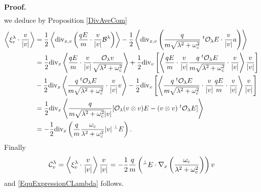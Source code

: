 \documentclass[12pt, a4paper]{article}
\newcounter{steps}
\newenvironment{proof}[1][]{%
\par\medbreak\setcounter{steps}{0}
{\noindent\bfseries Proof#1. }} {\hfill\fbox{\ }\medbreak}
\newcommand{\xil}[0]{
\xi^\lambda}
\newcommand{\bl}[0]{
{\cal B}^\lambda}
\newcommand{\cl}[0]{
{\cal C} ^\lambda}
\newcommand{\ol}[0]{
{\cal O}_\lambda}
\newcommand{\radlo}[0]{
\sqrt{\lambda ^2 + \omega _c ^2}}
\newcommand{\Divx}[0]{
\mathrm{div}_x}
\newcommand{\Divv}[0]{
\mathrm{div}_v}
\newcommand{\Divxv}[0]{
\mathrm{div}_{x,v}}
\newcommand{\ave}[1]{
\left \langle #1 \right \rangle }
\begin{document}
\begin{proof}
\begin{align*}
\end{align*}
we deduce by Proposition \ref{DivAveCom}
\begin{align*}
\ave{\xil _v \cdot \frac{v}{|v|}} & = \frac{1}{2}\ave{\Divxv \left (\frac{qE}{m} \cdot \frac{v}{|v|} \bl \right )} - \frac{1}{2} \ave{\Divxv\left ( \frac{q}{m\radlo} \;{^t \ol} E \cdot \frac{v}{|v|} a   \right ) }\\
& = \frac{1}{2} \Divx \ave{\frac{qE}{m} \cdot \frac{v}{|v|} \frac{\ol v}{\radlo}} + 
\frac{1}{2}\Divv \left [ \ave{\frac{qE}{m} \cdot \frac{v}{|v|} \frac{q \;{^t \ol} E}{m \radlo}\cdot \frac{v}{|v|}   }\frac{v}{|v|}  \right ]\\
& - \frac{1}{2} \Divx \ave{\frac{q\;{^t \ol}E}{m\radlo} \cdot  \frac{v}{|v|} v} -
\frac{1}{2}\Divv \left [ \ave{ \frac{q \;{^t \ol} E}{m \radlo}\cdot \frac{v}{|v|} \frac{qE}{m} \cdot \frac{v}{|v|}  }\frac{v}{|v|}  \right ]\\
& = \frac{1}{2}\Divx \ave{\frac{q}{m \radlo |v|} [ \ol (v\otimes v) E - (v \otimes v) \;{^t \ol} E]}\\
& = - \frac{1}{2} \Divx \left ( \frac{q}{m} \frac{\omega _c}{\lambda ^2 + \omega _c ^2} |v| \;{^\perp E} \right ).
\end{align*}
Finally 
\[
\cl _v = \ave{\xil _v \cdot \frac{v}{|v|}} \frac{v}{|v|} = - \frac{1}{2} \frac{q}{m} \left ( {^\perp E} \cdot \nabla _x \left ( \frac{\omega _c}{\lambda ^2 + \omega _c ^2} \right ) \right )v
\]
and \eqref{EquExpressionCLambda} follows.
\end{proof}


\end{document}
